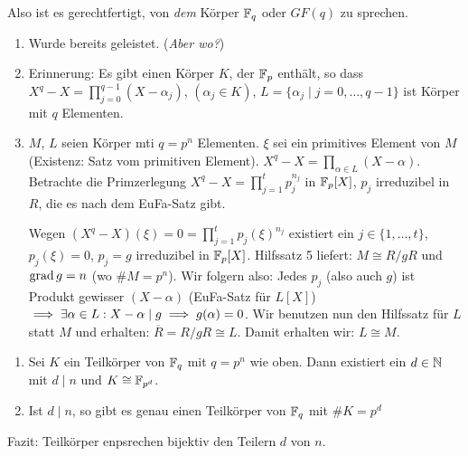 \documentclass[a4paper,twoside,DIV15,BCOR12mm]{scrbook}
\begin{document}
Also ist es gerechtfertigt, von \emph{dem} Körper $\mathbb{F}_q$ oder $GF(q)$ zu sprechen.

\begin{beweis}
\begin{enumerate}
\item Wurde bereits geleistet. (\emph{Aber wo?})
\item Erinnerung: Es gibt einen Körper $K$, der $\mathbb{F}_p$ enthält, so dass $X^q-X=\prod_{j=0}^{q-1}(X-\alpha_j)$, $(\alpha_j\in K)$, $L=\{\alpha_j\mid j=0,\ldots,q-1\}$ ist Körper mit $q$ Elementen.
\item $M$, $L$ seien Körper mti $q=p^n$ Elementen. $\xi$ sei ein primitives Element von $M$ (Existenz: Satz vom primitiven Element). $X^q-X = \prod_{\alpha \in L}(X-\alpha)$. Betrachte die Primzerlegung $X^q-X = \prod_{j=1}^tp_j^{n_j}$ in $\mathbb{F}_p[X]$, $p_j$ irreduzibel in $R$, die es nach dem EuFa-Satz gibt.

Wegen $(X^q-X)(\xi) = 0 = \prod_{j=1}^t p_j(\xi)^{n_j}$ existiert ein $j\in\{1,\ldots,t\}$, $p_j(\xi)=0$, $p_j=g$ irreduzibel in $\mathbb{F}_p[X]$. Hilfssatz 5 liefert: $M\cong R/gR$ und $\mathop{\mathrm{grad}}\nolimits g = n$ (wo $\#M=p^n$). Wir folgern also: Jedes $p_j$ (also auch $g$) ist Produkt gewisser $(X-\alpha)$ (EuFa-Satz für $L[X]$) $\implies \exists \alpha \in L: X-\alpha \mid g \implies g(\alpha) = 0$. Wir benutzen nun den Hilfssatz für $L$ statt $M$ und erhalten: $\overline R = R/gR \cong L$. Damit erhalten wir: $L\cong M$.
\end{enumerate}
\end{beweis}

\begin{satz}[Teilkörpersatz]
\begin{enumerate}
\item Sei $K$ ein Teilkörper von $\mathbb{F}_q$ mit $q=p^n$ wie oben. Dann existiert ein $d\in\mathbb{N}$ mit $d\mid n$ und $K\cong \mathbb{F}_{p^d}$.
\item Ist $d\mid n$, so gibt es genau einen Teilkörper von $\mathbb{F}_q$ mit $\#K=p^d$
\end{enumerate}

Fazit: Teilkörper enpsrechen bijektiv den Teilern $d$ von $n$.
\end{satz}
\end{document}
